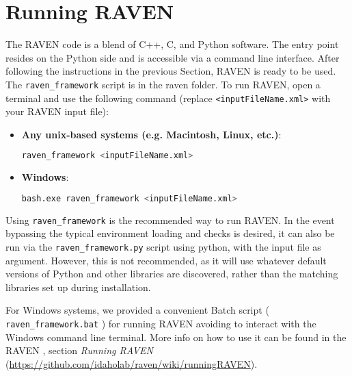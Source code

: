\section{Running RAVEN}
\label{HowToRun}

The RAVEN code is a blend of C++, C, and Python software. The entry point
resides on the Python side and is accessible via a command line interface.
%
After following the instructions in the previous Section, RAVEN is ready to be
used.
%
The \texttt{raven\_framework} script is in the raven folder.
%
To run RAVEN, open a terminal and use the following command (replace \texttt{<inputFileName.xml>} with your RAVEN input file):

\begin{itemize}

  \item \textbf{Any unix-based systems (e.g. Macintosh, Linux, etc.)}:
\begin{lstlisting}[language=bash]
raven_framework <inputFileName.xml>
\end{lstlisting}
  \item \textbf{Windows}:
  \begin{lstlisting}[language=bash]
bash.exe raven_framework <inputFileName.xml>
\end{lstlisting}
  
\end{itemize}

Using \texttt{raven\_framework} is the recommended way to run RAVEN.  In the event bypassing the typical
environment loading and checks is desired, it can also be run via
the \texttt{raven\_framework.py} script using python, with the input file as argument.  However, this is not
recommended, as it will use whatever default versions of Python and other libraries are discovered, rather
than the matching libraries set up during installation.

\nb For Windows systems, we provided a convenient Batch script ( \texttt{raven\_framework.bat} ) for running RAVEN 
avoiding to interact with the Windows command line terminal. More info on how to use it can be found in the RAVEN
\wiki , section \textit{Running RAVEN} (\url{https://github.com/idaholab/raven/wiki/runningRAVEN}).

